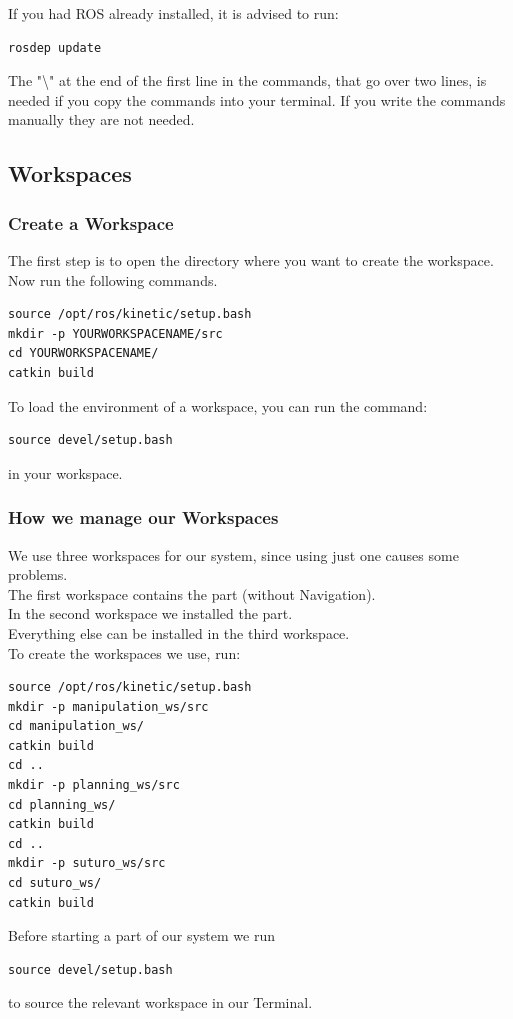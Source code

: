 \documentclass[main.tex]{subfiles}
\begin{document}
If you had ROS already installed, it is advised to run:
\begin{lstlisting}
rosdep update
\end{lstlisting}
The "\textbackslash" at the end of the first line in the commands, that go over two lines, is needed if you copy the commands into your terminal. If you write the commands manually they are not needed.
	
	\subsection{Workspaces}
	\subsubsection{Create a Workspace}
	The first step is to open the directory where you want to create the workspace.\\
	Now run the following commands.
	\begin{lstlisting}
source /opt/ros/kinetic/setup.bash
mkdir -p YOURWORKSPACENAME/src
cd YOURWORKSPACENAME/
catkin build 
\end{lstlisting}
	
	To load the environment of a workspace, you can run the command:
	\begin{lstlisting}
source devel/setup.bash
\end{lstlisting}
	in your workspace.
	
	\subsubsection{How we manage our Workspaces} \label{workspace_management}
	
	We use three workspaces for our system, since using just one causes some problems.\\
	The first workspace contains the  part (without Navigation).\\
	In the second workspace we installed the  part.\\
	Everything else can be installed in the third workspace.\\
	To create the workspaces we use, run:
	\begin{lstlisting}
source /opt/ros/kinetic/setup.bash
mkdir -p manipulation_ws/src
cd manipulation_ws/
catkin build 
cd ..
mkdir -p planning_ws/src
cd planning_ws/
catkin build 
cd ..
mkdir -p suturo_ws/src
cd suturo_ws/
catkin build 
\end{lstlisting}
	
	Before starting a part of our system we run 
	\begin{lstlisting}
source devel/setup.bash
\end{lstlisting}
to source the relevant workspace in our Terminal.
	
\end{document}
